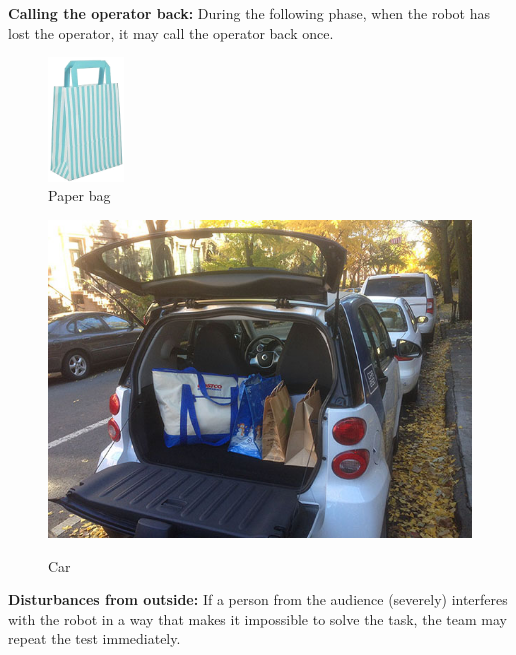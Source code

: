 \begin{enumerate}
\begin{minipage}{0.65\textwidth}
  \item \textbf{Calling the operator back:} During the following phase, when the robot has lost the operator, it may call the operator back once.
  \end{minipage}\hfill%
  \begin{minipage}{0.65\textwidth}
  \end{minipage}\hfill
  \begin{minipage}{0.25\textwidth}
    \vspace{-20pt}
    \begin{figure}[H]
      \centering
      \includegraphics[width=2cm]{images/help_me_carry_bag.png}%
      \vspace{-10pt}
      \caption{Paper bag}
      \label{fig:help_me_carry_paper_bag}
    \end{figure}
    \vspace{-10pt}
    \begin{figure}[H]
      \centering
      \includegraphics[width=\textwidth]{images/help_me_carry_car.png}%
      \vspace{-20pt}
      \label{fig:help_me_carry_car}
      \caption{Car}
    \end{figure}
  \end{minipage}
  \item \textbf{Disturbances from outside:} If a person from the audience (severely) interferes with the robot in a way that makes it impossible to solve the task, the team may repeat the test immediately.


\end{enumerate}
